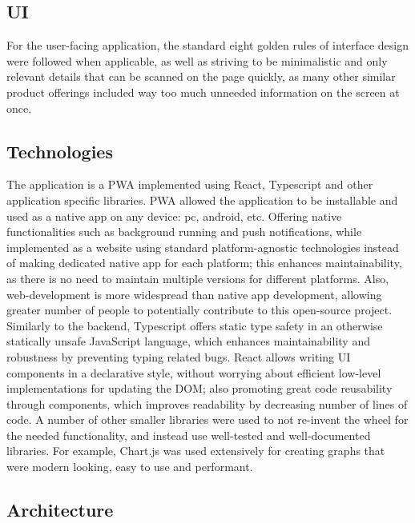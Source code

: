 \subsection{UI}
For the user-facing application, the standard eight golden rules of interface design \cite{goldenRulesUI} were followed when applicable, as well as striving to be minimalistic and only relevant details that can be scanned on the page quickly, as many other similar product offerings included way too much unneeded information on the screen at once. 
\subsection{Technologies}
The application is a PWA implemented using React, Typescript and other application specific libraries. PWA allowed the application to be installable and used as a native app on any device: pc, android, etc. Offering native functionalities such as background running and push notifications, while implemented as a website using standard platform-agnostic technologies instead of making dedicated native app for each platform; this enhances maintainability, as there is no need to maintain multiple versions for different platforms. Also, web-development is more widespread than native app development, allowing greater number of people to potentially contribute to this open-source project. Similarly to the backend, Typescript offers static type safety in an otherwise statically unsafe JavaScript language, which enhances maintainability and robustness by preventing typing related bugs. React allows writing UI components in a declarative style, without worrying about efficient low-level implementations for updating the DOM; also promoting great code reusability through components, which improves readability by decreasing number of lines of code. A number of other smaller libraries were used to not re-invent the wheel for the needed functionality, and instead use well-tested and well-documented libraries. For example, Chart.js was used extensively for creating graphs that were modern looking, easy to use and performant. 
\subsection{Architecture}

